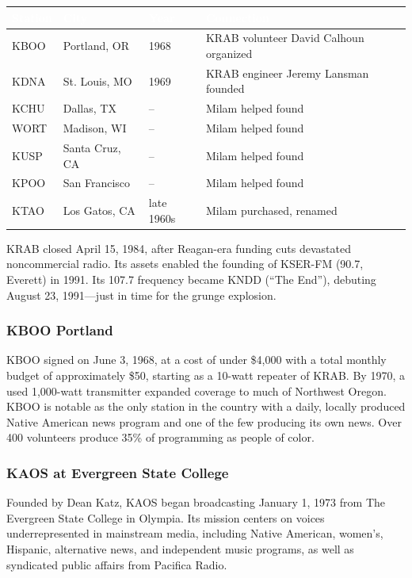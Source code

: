 \documentclass[11pt,letterpaper]{article}
\newcommand{\tableheader}[1]{\textbf{\sffamily\textcolor{white}{#1}}}
\begin{document}
\begin{center}
\begin{tabularx}{\textwidth}{L{2cm}L{2.5cm}L{2cm}X}
\toprule
{}
\tableheader{Station} & \tableheader{City} & \tableheader{Year} & \tableheader{Connection} \\
\midrule
KBOO & Portland, OR & 1968 & KRAB volunteer David Calhoun organized \\
KDNA & St. Louis, MO & 1969 & KRAB engineer Jeremy Lansman founded \\
KCHU & Dallas, TX & -- & Milam helped found \\
WORT & Madison, WI & -- & Milam helped found \\
KUSP & Santa Cruz, CA & -- & Milam helped found \\
KPOO & San Francisco & -- & Milam helped found \\
KTAO & Los Gatos, CA & late 1960s & Milam purchased, renamed \\
\bottomrule
\end{tabularx}
\end{center}

KRAB closed April 15, 1984, after Reagan-era funding cuts devastated noncommercial radio. Its assets enabled the founding of KSER-FM (90.7, Everett) in 1991. Its 107.7 frequency became KNDD (``The End''), debuting August 23, 1991---just in time for the grunge explosion.

\subsubsection{KBOO Portland}

KBOO signed on June 3, 1968, at a cost of under \$4,000 with a total monthly budget of approximately \$50, starting as a 10-watt repeater of KRAB. By 1970, a used 1,000-watt transmitter expanded coverage to much of Northwest Oregon. KBOO is notable as the only station in the country with a daily, locally produced Native American news program and one of the few producing its own news. Over 400 volunteers produce 35\% of programming as people of color.

\subsubsection{KAOS at Evergreen State College}

Founded by Dean Katz, KAOS began broadcasting January 1, 1973 from The Evergreen State College in Olympia. Its mission centers on voices underrepresented in mainstream media, including Native American, women's, Hispanic, alternative news, and independent music programs, as well as syndicated public affairs from Pacifica Radio.
\end{document}
